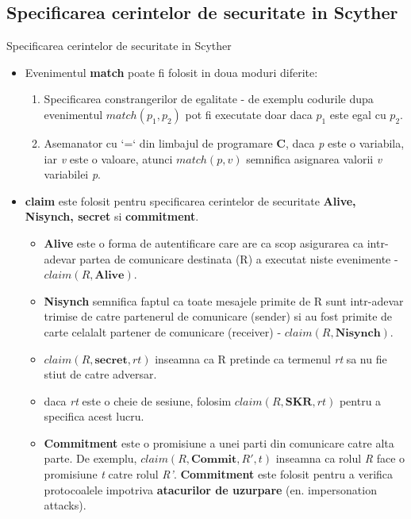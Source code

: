 \documentclass[11pt]{beamer}
\begin{document}
\subsection{Specificarea cerintelor de securitate in Scyther}
\begin{frame}[t,allowframebreaks]{Specificarea cerintelor de securitate in Scyther}

\begin{itemize}

\item Evenimentul \textbf{match} poate fi folosit in doua moduri diferite:

	\begin{enumerate}

	\item Specificarea constrangerilor de egalitate - de exemplu codurile dupa evenimentul $match(p_1, p_2)$ pot fi executate doar daca $p_1$ este egal cu $p_2$.
	\item Asemanator cu `=` din limbajul de programare \textbf{C}, daca \textit{p} este o variabila, iar \textit{v} este o valoare, atunci $match(p, v)$ semnifica asignarea valorii \textit{v} variabilei \textit{p}.
	
	\end{enumerate}
	
\item \textbf{claim} este folosit pentru specificarea cerintelor de securitate \textbf{Alive, Nisynch, secret} si \textbf{commitment}.
	\begin{itemize}

	\item \textbf{Alive} este o forma de autentificare care are ca scop asigurarea ca intr-adevar partea de comunicare destinata (R) a executat niste evenimente - $claim(R,\textbf{Alive})$.
	
	\item \textbf{Nisynch} semnifica faptul ca toate mesajele primite de R sunt intr-adevar trimise de catre partenerul de comunicare (sender) si au fost primite de carte celalalt partener de comunicare (receiver) - $claim(R,\textbf{Nisynch})$.
	
	\item $claim(R, \textbf{secret}, rt)$ inseamna ca R pretinde ca termenul \textit{rt} sa nu fie stiut de catre adversar.
	
	\item daca \textit{rt} este o cheie de sesiune, folosim $claim(R,\textbf{SKR}, rt)$ pentru a specifica acest lucru.
	
	\item \textbf{Commitment} este o promisiune a unei parti din comunicare catre alta parte. De exemplu, $claim(R,\textbf{Commit}, R', t)$ inseamna ca rolul \textit{R} face o promisiune \textit{t} catre rolul \textit{R'}. \textbf{Commitment} este folosit pentru a verifica protocoalele impotriva \textbf{atacurilor de uzurpare} (en. impersonation attacks).
	
	\end{itemize}

\end{itemize}

\end{frame}
\end{document}
